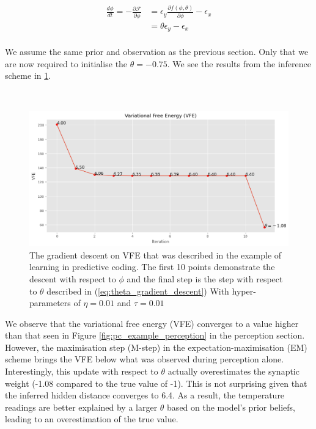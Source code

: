 \documentclass{article}
\newcommand{\refp}[1]{(\ref{#1})}
\begin{document}
\begin{equation}\label{eq:pc_learning_phi}
	\begin{aligned}
		\frac{d \phi}{dt} = -\frac{\partial \mathcal{F}}{\partial \phi} &= \epsilon_y \frac{\partial f(\phi, \theta)}{\partial \phi} - \epsilon_x \\
		&= \theta \epsilon_y - \epsilon_x \\
    \end{aligned}
\end{equation}

We assume the same prior and observation as the previous section. Only that we are now required to initialise the $\theta = -0.75$. We see the results from the inference scheme in \ref{fig:pc_example_learning}. 

\

\begin{figure}[htbp]
	\centering
	\includegraphics[scale=0.5]{images/pc_example_learning.png}
	\caption{The gradient descent on VFE that was described in the example of learning in predictive coding. The first 10 points demonstrate the descent with respect to $\phi$ and the final step is the step with respect to $\theta$ described in \refp{eq:theta_gradient_descent} With hyper-parameters of $\eta = 0.01$ and $\tau = 0.01$} 
	\label{fig:pc_example_learning}
\end{figure}

We observe that the variational free energy (VFE) converges to a value higher than that seen in Figure \ref{fig:pc_example_perception} in the perception section. However, the maximisation step (M-step) in the expectation-maximisation (EM) scheme brings the VFE below what was observed during perception alone. Interestingly, this update with respect to $\theta$ actually overestimates the synaptic weight (-1.08 compared to the true value of -1). This is not surprising given that the inferred hidden distance converges to 6.4. As a result, the temperature readings are better explained by a larger $\theta$ based on the model’s prior beliefs, leading to an overestimation of the true value.
\end{document}
